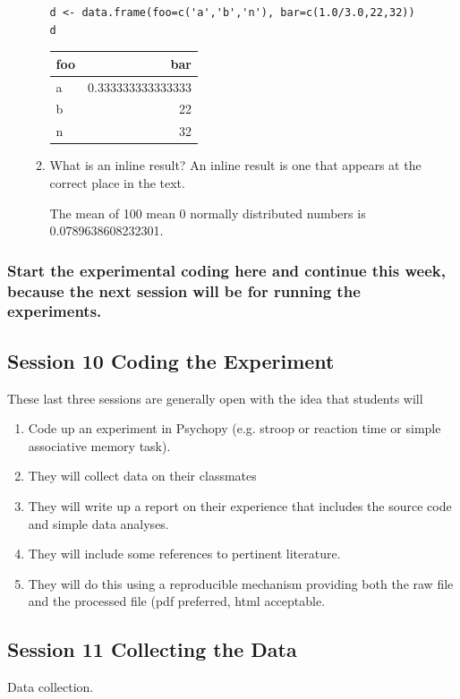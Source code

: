 \documentclass{article}
\begin{document}
\begin{enumerate}
\begin{enumerate}
\begin{verbatim}
d <- data.frame(foo=c('a','b','n'), bar=c(1.0/3.0,22,32))
d
\end{verbatim}

\begin{center}
\begin{tabular}{lr}
foo & bar\\
\hline
a & 0.333333333333333\\
b & 22\\
n & 32\\
\end{tabular}
\end{center}

\item What is an inline result?
\label{sec:org52d2866}
An inline result is one that appears at the correct place in the text. 

The mean of 100 mean 0 normally distributed numbers is 0.0789638608232301.
\end{enumerate}
\end{enumerate}



\subsubsection{Start the experimental coding here and continue this week, because the next session will be for running the experiments.}
\label{sec:org2bf8ccb}
\subsection{Session 10 Coding the Experiment}
\label{sec:org32ceab9}
These last three sessions are generally open with the idea that students will 
\begin{enumerate}
\item Code up an experiment in Psychopy (e.g. stroop or reaction time or simple associative memory task).
\item They will collect data on their classmates
\item They will write up a report on their experience that includes the source code and simple data analyses.
\item They will include some references to pertinent literature.
\item They will do this using a reproducible mechanism providing both the raw file and the processed file (pdf preferred, html acceptable.
\end{enumerate}
\subsection{Session 11 Collecting the Data}
\label{sec:org8dc0b37}
Data collection.
\end{document}
